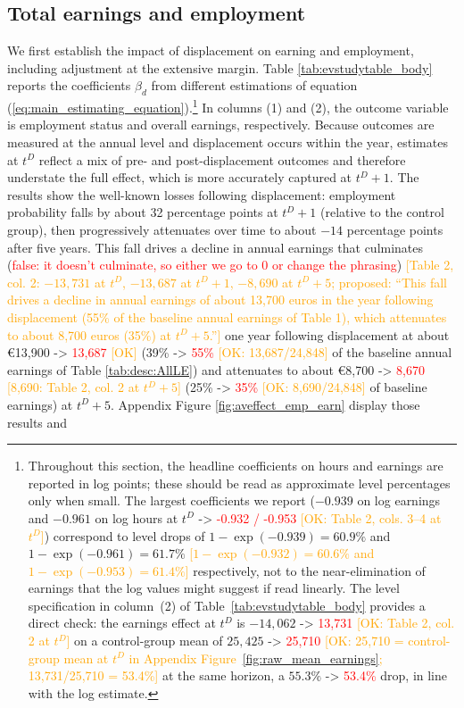 \subsection{Total earnings and employment}\label{sec:earnings_employment} %
We first establish the impact of displacement on earning and employment, including adjustment at the extensive margin. Table \ref{tab:evstudytable_body} reports the coefficients $\beta_{d}$ from different estimations of equation (\ref{eq:main_estimating_equation}).\footnote{Throughout this section, the headline coefficients on hours and earnings are reported in log points; these should be read as approximate level percentages only when small. The largest coefficients we report ($-0.939$ on log earnings and $-0.961$ on log hours at $t^D$ -> \textcolor{red}{-0.932 / -0.953} \textcolor{orange}{[OK: Table 2, cols. 3--4 at $t^D$]}) correspond to level drops of $1-\exp(-0.939) = 60.9\%$ and $1-\exp(-0.961) = 61.7\%$ \textcolor{orange}{[$1-\exp(-0.932)=60.6\%$ and $1-\exp(-0.953)=61.4\%$]} respectively, not to the near-elimination of earnings that the log values might suggest if read linearly. The level specification in column~(2) of Table~\ref{tab:evstudytable_body} provides a direct check: the earnings effect at $t^D$ is $-14{,}062$\EUR{} -> \textcolor{red}{13,731} \textcolor{orange}{[OK: Table 2, col. 2 at $t^D$]} on a control-group mean of $25{,}425$\EUR{} -> \textcolor{red}{25,710} \textcolor{orange}{[OK: 25,710 = control-group mean at $t^D$ in Appendix Figure~\ref{fig:raw_mean_earnings}; 13,731/25,710 = 53.4\%]} at the same horizon, a $55.3\%$ -> \textcolor{red}{53.4\%} drop, in line with the log estimate.} In columns (1) and (2), the outcome variable is employment status and overall earnings, respectively. Because outcomes are measured at the annual level and displacement occurs within the year, estimates at $t^D$ reflect a mix of pre- and post-displacement outcomes and therefore understate the full effect, which is more accurately captured at $t^D+1$. The results show the well-known losses following displacement: employment probability falls by about 32 percentage points at $t^D+1$ (relative to the control group), then progressively attenuates over time to about $-14$ percentage points after five years. This fall drives a decline in annual earnings that culminates (\textcolor{red}{false: it doesn't culminate, so either we go to 0 or change the phrasing}) \textcolor{orange}{[Table 2, col. 2: $-13{,}731$ at $t^D$, $-13{,}687$ at $t^D+1$, $-8{,}690$ at $t^D+5$; proposed: ``This fall drives a decline in annual earnings of about 13,700 euros in the year following displacement (55\% of the baseline annual earnings of Table 1), which attenuates to about 8,700 euros (35\%) at $t^D+5$.'']} one year following displacement at about \euro 13,900 -> \textcolor{red}{13,687} \textcolor{orange}{[OK]} (39\% -> \textcolor{red}{55\%} \textcolor{orange}{[OK: 13,687/24,848]} of the baseline annual earnings of Table \ref{tab:desc:AllLE}) and attenuates to about \euro 8,700 -> \textcolor{red}{8,670} \textcolor{orange}{[8,690: Table 2, col. 2 at $t^D+5$]} (25\% -> \textcolor{red}{35\%} \textcolor{orange}{[OK: 8,690/24,848]} of baseline earnings) at $t^D+5$. Appendix Figure \ref{fig:aveffect_emp_earn} display those results and 